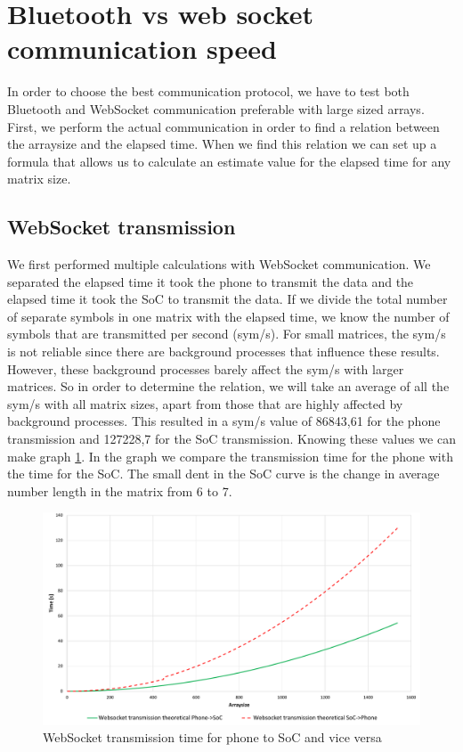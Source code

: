 \documentclass[a4paper, 11pt]{report}
\begin{document}
\section{Bluetooth vs web socket communication speed}
In order to choose the best communication protocol, we have to test both Bluetooth and WebSocket communication preferable with large sized arrays. First, we perform the actual communication in order to find a relation between the arraysize and the elapsed time. When we find this relation we can set up a formula that allows us to calculate an estimate value for the elapsed time for any matrix size.

	\subsection{WebSocket transmission}
We first performed multiple calculations with WebSocket communication. We separated the elapsed time it took the phone to transmit the data and the elapsed time it took the SoC to transmit the data. If we divide the total number of separate symbols in one matrix with the elapsed time, we know the number of symbols that are transmitted per second (sym/s). For small matrices, the sym/s is not reliable since there are background processes that influence these results. However, these background processes barely affect the sym/s with larger matrices. So in order to determine the relation, we will take an average of all the sym/s with all matrix sizes, apart from those that are highly affected by background processes. This resulted in a sym/s value of 86843,61 for the phone transmission and 127228,7 for the SoC transmission. Knowing these values we can make graph \ref{graph:websocketTime}. In the graph we compare the transmission time for the phone with the time for the SoC. The small dent in 
the SoC curve is the change in average number length in the matrix from 6 to 7.
\begin{figure}[ht]
\centering
\includegraphics[scale=0.45]{images/WebsocketTransmissionSpeed.pdf}
\caption{WebSocket transmission time for phone to SoC and vice versa}\label{graph:websocketTime}
\end{figure}
\end{document}
